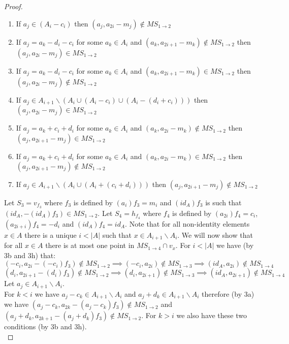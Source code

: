 \documentclass{report}
\begin{document}
\begin{proof}
\begin{enumerate}
\begin{enumerate}
\item If \(a_j\in (A_i-c_i)\) then \((a_j,a_{2i}-m_j)\notin MS_{1\rightarrow 2}\)
\item If \(a_j= a_k-d_i-c_i\) for some \(a_k\in A_i\) and \((a_k,a_{2i+1}-m_k)\notin MS_{1\rightarrow 2}\) then \((a_j,a_{2i}-m_{j})\in MS_{1\rightarrow 2}\)
\item If \(a_j= a_k-d_i-c_i\) for some \(a_k\in A_i\) and \((a_k,a_{2i+1}-m_k)\in MS_{1\rightarrow 2}\) then \((a_j,a_{2i}-m_{j})\notin MS_{1\rightarrow 2}\)
\item If \(a_j\in A_{i+1}\backslash (A_i \cup (A_i-c_i)\cup (A_i-(d_i+c_i)))\) then \((a_j,a_{2i}-m_j)\in MS_{1\rightarrow 2}\)
\item If \(a_j= a_k+c_i+d_i\) for some \(a_k\in A_i\) and \((a_k,a_{2i}-m_k)\notin MS_{1\rightarrow 2}\) then \((a_j,a_{2i+1}-m_{j})\in MS_{1\rightarrow 2}\)
\item If \(a_j= a_k+c_i+d_i\) for some \(a_k\in A_i\) and \((a_k,a_{2i}-m_k)\in MS_{1\rightarrow 2}\) then \((a_j,a_{2i+1}-m_{j})\notin MS_{1\rightarrow 2}\)
\item If \(a_j\in A_{i+1}\backslash (A_i \cup (A_i+(c_i+d_i)))\) then \((a_j,a_{2i+1}-m_j)\notin MS_{1\rightarrow 2}\)
\end{enumerate}
\end{enumerate}
Let \(S_3=v_{f_3}\) where \(f_3\) is defined by \((a_i)f_3=m_i\) and \((id_A)f_3\) is such that \((id_A,-(id_A)f_3)\in MS_{1\rightarrow 2}\). Let \(S_4=h_{f_4}\) where \(f_4\) is defined by \((a_{2i})f_4=c_i\), \((a_{2i+i})f_4=-d_i\) and \((id_A)f_4=id_A\). Note that for all non-identity elements  \(x\in A\) there is a unique \(i<|A|\) such that \(x\in A_{i+1}\backslash A_i\). 
We will now show that for all \(x\in A\) there is at most one point in \(MS_{1\rightarrow 4}\cap v_x\). For \(i<|A|\) we have (by 3b and 3h) that:
\[(-c_i,a_{2i}-(-c_i)f_3)\notin MS_{1\rightarrow 2}\implies (-c_i,a_{2i})\notin MS_{1\rightarrow 3} \implies (id_A,a_{2i})\notin MS_{1\rightarrow 4}\]
\[(d_i,a_{2i+1}-(d_i)f_3)\notin MS_{1\rightarrow 2}\implies (d_i,a_{2i+1})\notin MS_{1\rightarrow 3} \implies (id_A,a_{2i+1})\notin MS_{1\rightarrow 4}\]
Let \(a_{j}\in A_{i+1}\backslash A_{i}\).\\
For \(k<i\) we have \( a_j -c_k\in A_{i+1}\backslash A_{i}\) and \( a_j +d_k\in A_{i+1}\backslash A_{i}\) therefore (by 3a) we have \((a_j-c_k,a_{2k}-(a_j-c_k)f_3)\notin MS_{1\rightarrow 2}\) and \((a_j+d_k,a_{2k+1}-(a_j+d_k)f_3)\notin MS_{1\rightarrow 2}\).  For \(k>i\) we also have these two conditions (by 3b and 3h).\\

\end{proof}
\end{document}
